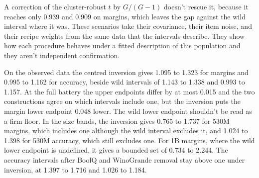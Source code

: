 A correction of the cluster-robust $t$ by $G/(G-1)$ doesn't rescue it, because it reaches only 0.939 and 0.909 on margins, which leaves the gap against the wild interval where it was. These scenarios take their covariance, their item noise, and their recipe weights from the same data that the intervals describe. They show how each procedure behaves under a fitted description of this population and they aren't independent confirmation.

On the observed data the centred inversion gives 1.095 to 1.323 for margins and 0.995 to 1.162 for accuracy, beside wild intervals of 1.143 to 1.338 and 0.993 to 1.157. At the full battery the upper endpoints differ by at most 0.015 and the two constructions agree on which intervals include one, but the inversion puts the margin lower endpoint 0.048 lower. The wild lower endpoint shouldn't be read as a firm floor. In the size bands, the inversion gives 0.765 to 1.737 for 530M margins, which includes one although the wild interval excludes it, and 1.024 to 1.398 for 530M accuracy, which still excludes one. For 1B margins, where the wild lower endpoint is undefined, it gives a bounded set of 0.734 to 2.244. The accuracy intervals after BoolQ and WinoGrande removal stay above one under inversion, at 1.397 to 1.716 and 1.026 to 1.184.

